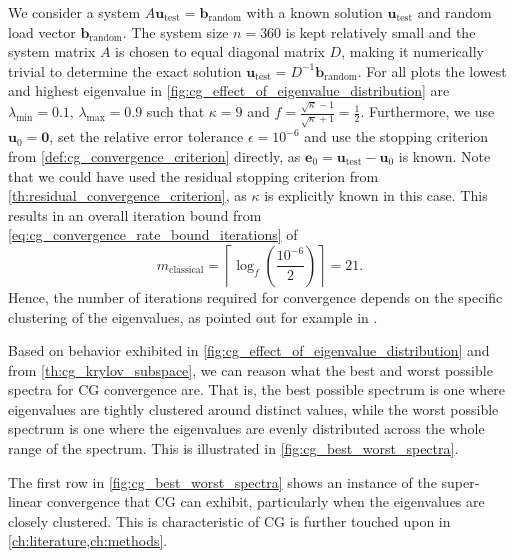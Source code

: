 We consider a system $A\mathbf{u}_{\text{test}} = \mathbf{b}_{\text{random}}$ with a known solution $\mathbf{u}_{\text{test}}$ and random load vector $\mathbf{b}_{\text{random}}$. The system size $n=360$ is kept relatively small and the system matrix $A$ is chosen to equal diagonal matrix $D$, making it numerically trivial to determine the exact solution $\mathbf{u}_{\text{test}} = D^{-1}\mathbf{b}_{\text{random}}$. For all plots the lowest and highest eigenvalue in \cref{fig:cg_effect_of_eigenvalue_distribution} are $\lambda_{\text{min}} = 0.1$, $\lambda_{\text{max}} = 0.9$ such that $\kappa = 9$ and $f = \frac{\sqrt{\kappa} - 1}{\sqrt{\kappa} + 1} = \frac{1}{2}$. Furthermore, we use $\mathbf{u}_{0} = \mathbf{0}$, set the relative error tolerance $\epsilon = 10^{-6}$ and use the stopping criterion from \cref{def:cg_convergence_criterion} directly, as $\mathbf{e}_0 = \mathbf{u}_{\text{test}} - \mathbf{u}_{0}$ is known. Note that we could have used the residual stopping criterion from \cref{th:residual_convergence_criterion}, as $\kappa$ is explicitly known in this case. This results in an overall iteration bound from \cref{eq:cg_convergence_rate_bound_iterations} of
\[
  m_{\text{classical}} = \left\lceil\log_f\left(\frac{10^{-6}}{2}\right)\right\rceil = 21.
\]
Hence, the number of iterations required for convergence depends on the specific clustering of the eigenvalues, as pointed out for example in \cite[Section 2.3]{nonlinear_cg_Kelley_1995}.

Based on behavior exhibited in \cref{fig:cg_effect_of_eigenvalue_distribution} and from \cref{th:cg_krylov_subspace}, we can reason what the best and worst possible spectra for CG convergence are. That is, the best possible spectrum is one where eigenvalues are tightly clustered around distinct values, while the worst possible spectrum is one where the eigenvalues are evenly distributed across the whole range of the spectrum. This is illustrated in \cref{fig:cg_best_worst_spectra}.

The first row in \cref{fig:cg_best_worst_spectra} shows an instance of the super-linear convergence that CG can exhibit, particularly when the eigenvalues are closely clustered. This is characteristic of CG is further touched upon in \cref{ch:literature,ch:methods}.

